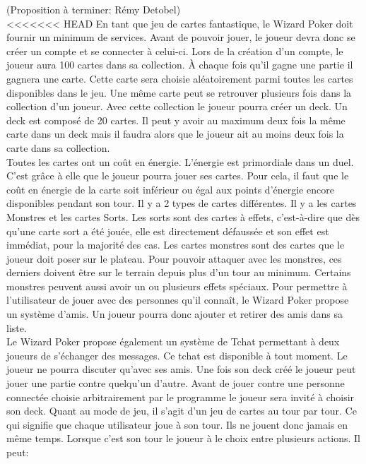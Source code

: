 \documentclass[11pt,a4paper]{article}
\begin{document}
(Proposition à terminer: Rémy Detobel)\\
<<<<<<< HEAD
En tant que jeu de cartes fantastique, le Wizard Poker doit fournir un minimum de services. Avant de pouvoir jouer, le joueur devra donc se créer un compte et se connecter à celui-ci. Lors de la création d'un compte, le joueur aura 100 cartes dans sa \gls{collection}. À chaque fois qu'il gagne une partie il gagnera une carte. Cette carte sera choisie aléatoirement parmi toutes les cartes disponibles dans le jeu. Une même carte peut se retrouver plusieurs fois dans la \gls{collection} d'un joueur. Avec cette \gls{collection} le joueur pourra créer un \gls{deck}. Un \gls{deck} est composé de 20 cartes. Il peut y avoir au maximum deux fois la même carte dans un \gls{deck} mais il faudra alors que le joueur ait au moins deux fois la carte dans sa \gls{collection}.\\
Toutes les cartes ont un coût en énergie. L'énergie est primordiale dans un duel. C'est grâce à elle que le joueur pourra jouer ses cartes. Pour cela, il faut que le coût en énergie de la carte soit inférieur ou égal aux points d'énergie encore disponibles pendant son tour.
Il y a 2 types de cartes différentes. Il y a les cartes Monstres et les cartes Sorts. Les sorts sont des cartes à effets, c'est-à-dire que dès qu'une carte sort a été jouée, elle est directement défaussée et son effet est immédiat, pour la majorité des cas.
Les cartes monstres sont des cartes que le joueur doit poser sur le plateau. Pour pouvoir attaquer avec les monstres, ces derniers doivent être sur le terrain depuis plus d'un tour au minimum. Certains monstres peuvent aussi avoir un ou plusieurs effets spéciaux.
Pour permettre à l'utilisateur de jouer avec des personnes qu'il connaît, le Wizard Poker propose un système d'amis.  Un joueur pourra donc ajouter et retirer des amis dans sa liste.\\
Le Wizard Poker propose également un système de Tchat permettant à deux joueurs de s'échanger des messages.  Ce tchat est disponible à tout moment.  Le joueur ne pourra discuter qu'avec ses amis.
Une fois son \gls{deck} créé le joueur peut jouer une partie contre quelqu'un d'autre.  Avant de jouer contre une personne connectée choisie arbitrairement par le programme le joueur sera invité à choisir son \gls{deck}. Quant au mode de jeu,  il s'agit d'un jeu de cartes au tour par tour.  Ce qui signifie que chaque utilisateur joue à son tour.  Ils ne jouent donc jamais en même temps.  Lorsque c'est son tour le joueur à le choix entre plusieurs actions. Il peut:
\end{document}
